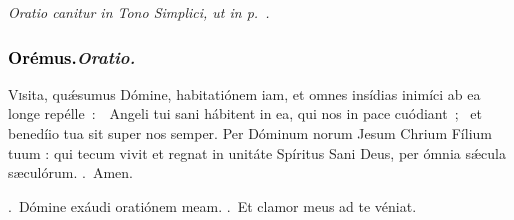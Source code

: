 \documentclass[12pt]{article} %
\newenvironment{rubric}{\vspace{2 mm}\color{benred8} \itshape \leftskip 0in \setlength{\parindent}{0.25in}}{\vspace{2 mm}}
\newenvironment{response}{\leftskip 0in \setlength{\parindent}{0in}}{\vspace{2 mm}}
\let\oldgresixstar\gresixstar
\renewcommand{\gresixstar}{\textcolor{benred8}{\oldgresixstar}}
\let\oldgredagger\gredagger
\renewcommand{\gredagger}{\textcolor{benred8}{\oldgredagger}}
\let\oldVbar\Vbar
\renewcommand{\Vbar}{\textcolor{benred8}{\oldVbar .}}
\let\oldRbar\Rbar
\renewcommand{\Rbar}{\textcolor{benred8}{\oldRbar .}}
\def\capitulumSpace{\hspace{20 mm}}
\begin{document}
\gresetfirstlineaboveinitial{\small \textsc{ \textbf{\textcolor{benred8}{\Vbar}}}}{\small \textsc{ \textbf{\textcolor{benred8}{\Vbar}}}}


\begin{rubric}
Oratio canitur in Tono Simplici, ut in p.~\pageref{OratioSimplex}.

\end{rubric}

\subsubsection*{\textcolor{black}{Or\'{e}mus.}\capitulumSpace \emph{Oratio.}}

\begin{response}\lettrine{V}{i}sita, qu\'{\ae}sumus D\'{o}mine, habitati\'{o}nem iam, et omnes ins\'{i}dias inim\'{i}ci ab ea longe rep\'{e}lle~:~\gredagger\ Angeli tui sani h\'{a}bitent in ea, qui nos in pace cu\'{o}diant~; \gresixstar\ et bened\'{i}io tua sit super nos semper. Per D\'{o}minum norum Jesum Chrium F\'{i}lium tuum : qui tecum vivit et regnat in unit\'{a}te Sp\'{i}ritus Sani Deus, per \'{o}mnia s\'{\ae}cula s\ae cul\'{o}rum. \Rbar\ Amen.

\end{response}

\begin{response}
\Vbar\ Dómine exáudi oratiónem meam. \Rbar\ Et clamor meus ad te véniat.

\end{response}

\vspace{1.5mm}

\gresetfirstlineaboveinitial{\small \textsc{ \textbf{\textcolor{benred8}{II}}}}{\small \textsc{ \textbf{\textcolor{benred8}{II}}}}

%
%
%
%
%
\end{document}
